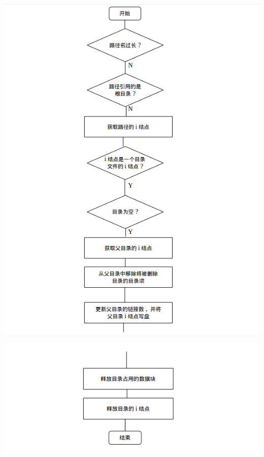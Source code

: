\documentclass[nofonts]{ctexart}
\begin{document}
\begin{itemize}
  \includegraphics[width=15cm]{./images/./rmdir_1.png}

  \includegraphics[width=15cm]{./images/./rmdir_2.png}
  \end{itemize}
\end{document}
